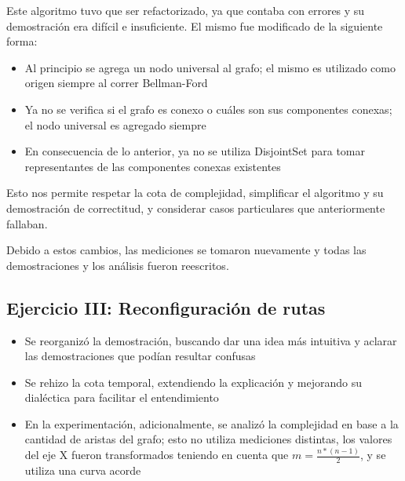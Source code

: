 		Este algoritmo tuvo que ser refactorizado, ya que contaba con errores y su demostración era difícil e insuficiente. El mismo fue modificado de la siguiente forma:
		
		\begin{itemize}
			\item Al principio se agrega un nodo universal al grafo; el mismo es utilizado como origen siempre al correr Bellman-Ford

			\item Ya no se verifica si el grafo es conexo o cuáles son sus componentes conexas; el nodo universal es agregado siempre

			\item En consecuencia de lo anterior, ya no se utiliza DisjointSet para tomar representantes de las componentes conexas existentes
		\end{itemize}

		Esto nos permite respetar la cota de complejidad, simplificar el algoritmo y su demostración de correctitud, y considerar casos particulares que anteriormente fallaban.

		Debido a estos cambios, las mediciones se tomaron nuevamente y todas las demostraciones y los análisis fueron reescritos.

	\subsection*{Ejercicio III: Reconfiguración de rutas}

	\begin{itemize}
		\item Se reorganizó la demostración, buscando dar una idea más intuitiva y aclarar las demostraciones que podían resultar confusas
		
		\item Se rehizo la cota temporal, extendiendo la explicación y mejorando su dialéctica para facilitar el entendimiento
				
		\item En la experimentación, adicionalmente, se analizó la complejidad en base a la cantidad de aristas del grafo; esto no utiliza mediciones distintas, los valores del eje X fueron transformados teniendo en cuenta que $m = \frac{n * (n - 1)}{2}$, y se utiliza una curva acorde

	\end{itemize}